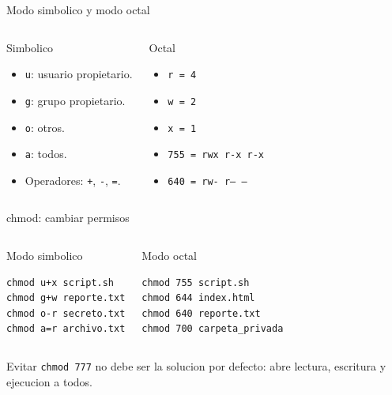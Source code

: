 \documentclass[aspectratio=169]{beamer}
\begin{document}
\begin{frame}{Modo simbolico y modo octal}
  \small
  \begin{columns}[t]
    \begin{block}{Simbolico}
      \begin{itemize}
        \item \texttt{u}: usuario propietario.
        \item \texttt{g}: grupo propietario.
        \item \texttt{o}: otros.
        \item \texttt{a}: todos.
        \item Operadores: \texttt{+}, \texttt{-}, \texttt{=}.
      \end{itemize}
    \end{block}
    \begin{exampleblock}{Octal}
      \begin{itemize}
        \item \texttt{r = 4}
        \item \texttt{w = 2}
        \item \texttt{x = 1}
        \item \texttt{755 = rwx r-x r-x}
        \item \texttt{640 = rw- r-- ---}
      \end{itemize}
    \end{exampleblock}
  \end{columns}
\end{frame}

\begin{frame}[fragile]{chmod: cambiar permisos}
  \begin{columns}[t]
    \begin{block}{Modo simbolico}
\begin{verbatim}
chmod u+x script.sh
chmod g+w reporte.txt
chmod o-r secreto.txt
chmod a=r archivo.txt
\end{verbatim}
    \end{block}
    \begin{block}{Modo octal}
\begin{verbatim}
chmod 755 script.sh
chmod 644 index.html
chmod 640 reporte.txt
chmod 700 carpeta_privada
\end{verbatim}
    \end{block}
  \end{columns}
  \vfill
  \begin{alertblock}{Evitar}
    \small \texttt{chmod 777} no debe ser la solucion por defecto: abre lectura, escritura y ejecucion a todos.
  \end{alertblock}
\end{frame}
\end{document}
